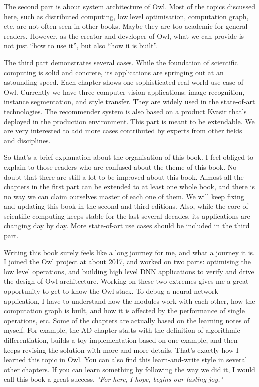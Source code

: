 The second part is about system architecture of Owl. Most of the topics discussed here, such as distributed computing, low level optimisation, computation graph, etc. are not often seen in other books.
Maybe they are too academic for general readers.
However, as the creator and developer of Owl, what we can provide is not just ``how to use it'', but also ``how it is built''.

The third part demonstrates several cases. While the foundation of scientific computing is solid and concrete, its applications are springing out at an astounding speed.
Each chapter shows one sophisticated real world use case of Owl.
Currently we have three computer vision applications: image recognition, instance segmentation, and style transfer. They are widely used in the state-of-art technologies.
The recommender system is also based on a product Kvasir that's deployed in the production environment.
This part is meant to be extendable.
We are very interested to add more cases contributed by experts from other fields and disciplines.

So that's a brief explanation about the organisation of this book. I feel obliged to explain to those readers who are confused about the theme of this book.
No doubt that there are still a lot to be improved about this book.
Almost all the chapters in the first part can be extended to at least one whole book, and there is no way we can claim ourselves master of each one of them.
We will keep fixing and updating this book in the second and third editions.
Also, while the core of scientific computing keeps stable for the last several decades, its applications are changing day by day.
More state-of-art use cases should be included in the third part.

Writing this book surely feels like a long journey for me, and what a journey it is.
I joined the Owl project at about 2017, and worked on two parts: optimising the low level operations, and building high level DNN applications to verify and drive the design of Owl architecture.
Working on these two extremes gives me a great opportunity to get to know the Owl stack. To debug a neural network application, I have to understand how the modules work with each other, how the computation graph is built, and how it is affected by the performance of single operations, etc.
Some of the chapters are actually based on the learning notes of myself.
For example, the AD chapter starts with the definition of algorithmic differentiation, builds a toy implementation based on one example, and then keeps revising the solution with more and more details.
That's exactly how I learned this topic in Owl.
You can also find this learn-and-write style in several other chapters.
If you can learn something by following the way we did it, I would call this book a great success.
\textit{"For here, I hope, begins our lasting joy."}

